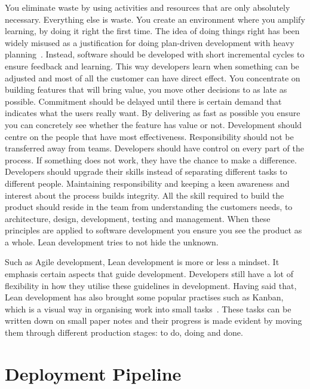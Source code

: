 \documentclass[english]{tktltiki2}
\begin{document}
You eliminate waste by using activities and resources that are only absolutely necessary. Everything else is waste. You create an environment where you amplify learning, by doing it right the first time. The idea of doing things right has been widely misused as a justification for doing plan-driven development with heavy planning~\cite{Pop02}. Instead, software should be developed with short incremental cycles to ensure feedback and learning. This way developers learn when something can be adjusted and most of all the customer can have direct effect. You concentrate on building features that will bring value, you move other decisions to as late as possible. Commitment should be delayed until there is certain demand that indicates what the users really want. By delivering as fast as possible you ensure you can concretely see whether the feature has value or not. Development should centre on the people that have most effectiveness. Responsibility should not be transferred away from teams. Developers should have control on every part of the process. If something does not work, they have the chance to make a difference. Developers should upgrade their skills instead of separating different tasks to different people. Maintaining responsibility and keeping a keen awareness and interest about the process builds integrity. All the skill required to build the product should reside in the team from understanding the customers needs, to architecture, design, development, testing and management. When these principles are applied to software development you ensure you see the product as a whole. Lean development tries to not hide the unknown.

Such as Agile development, Lean development is more or less a mindset. It emphasis certain aspects that guide development. Developers still have a lot of flexibility in how they utilise these guidelines in development. Having said that, Lean development has also brought some popular practises such as Kanban, which is a visual way in organising work into small tasks~\cite{Mon12}. These tasks can be written down on small paper notes and their progress is made evident by moving them through different production stages: to do, doing and done.


\section{Deployment Pipeline}
\end{document}

